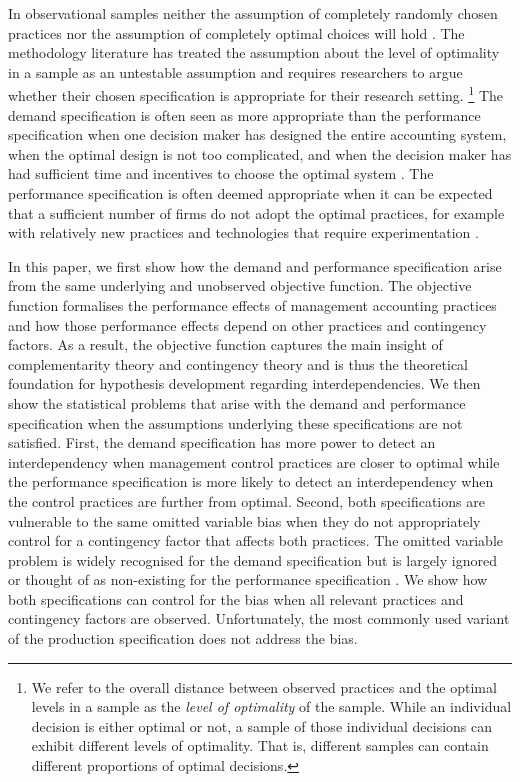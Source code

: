 \documentclass[12pt]{article}
\begin{document}
In observational samples neither the assumption of completely randomly chosen practices nor the assumption of completely optimal choices will hold \citep{brynjolfsson_complementarity_2013}. The methodology literature has treated the assumption about the level of optimality in a sample as an untestable assumption and requires researchers to argue whether their chosen specification is appropriate for their research setting. \footnote{We refer to the overall distance between observed practices and the optimal levels in a sample as the \emph{level of optimality} of the sample. While an individual decision is either optimal or not, a sample of those individual decisions can exhibit different levels of optimality. That is, different samples can contain different proportions of optimal decisions.}
The demand specification is often seen as more appropriate than the performance specification when one decision maker has designed the entire accounting system, when the optimal design is not too complicated, and when the decision maker has had sufficient time and incentives to choose the optimal system \citep{grabner_management_2013, hofmann_organizational_2017, carree_note_2011, johansson_testing_2018}.  The performance specification is often deemed appropriate when it can be expected that a sufficient number of firms do not adopt the optimal practices, for example with relatively new practices and technologies that require experimentation \citep{carree_note_2011, bedford_management_2016}. 

In this paper, we first show how the demand and performance specification arise from the same underlying and unobserved objective function. The objective function formalises the performance effects of management accounting practices and how those performance effects depend on other practices and contingency factors. As a result, the objective function captures the main insight of complementarity theory \citep{milgrom_complementarities_1995,grabner_management_2013} and contingency theory \citep{chenhall_management_2003,otley_contingency_2016} and is thus the theoretical foundation for hypothesis development regarding interdependencies. We then show the statistical problems that arise with the demand and performance specification when the assumptions underlying these specifications are not satisfied. First, the demand specification has more power to detect an interdependency when management control practices are closer to optimal while the performance specification is more likely to detect an interdependency when the control practices are further from optimal. Second, both specifications are vulnerable to the same omitted variable bias when they do not appropriately control for a contingency factor that affects both practices. The omitted variable problem is widely recognised for the demand specification \citep{grabner_management_2013, arora_testing_1996, hofmann_organizational_2017} but is largely ignored \citep{grabner_management_2013, hofmann_organizational_2017} or thought of as non-existing for the performance specification \citep{carree_note_2011}. We show how both specifications can control for the bias when all relevant practices and contingency factors are observed. Unfortunately, the most commonly used variant of the production specification does not address the bias.
\end{document}
